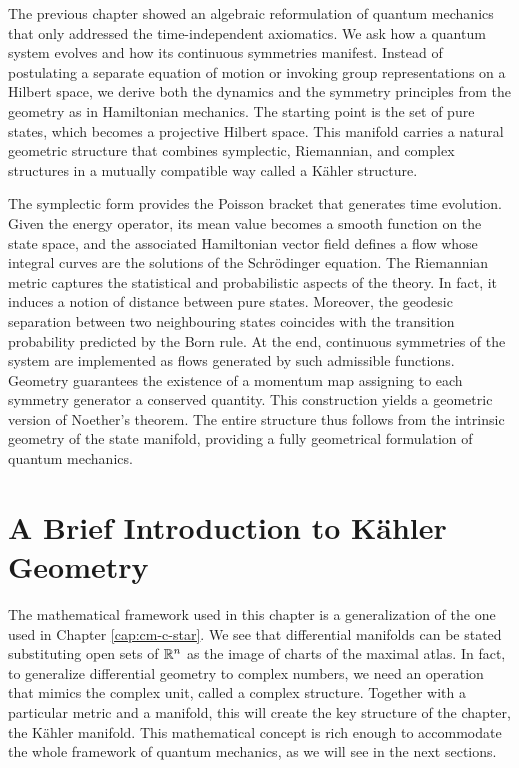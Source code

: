 The previous chapter showed an algebraic reformulation of quantum mechanics that only addressed the time-independent axiomatics. We ask how a quantum system evolves and how its continuous symmetries manifest. Instead of postulating a separate equation of motion or invoking group representations on a Hilbert space, we derive both the dynamics and the symmetry principles from the geometry as in Hamiltonian mechanics. The starting point is the set of pure states, which becomes a projective Hilbert space. This manifold carries a natural geometric structure that combines symplectic, Riemannian, and complex structures in a mutually compatible way called a Kähler structure. 

The symplectic form provides the Poisson bracket that generates time evolution. Given the energy operator, its mean value becomes a smooth function on the state space, and the associated Hamiltonian vector field defines a flow whose integral curves are the solutions of the Schrödinger equation. The Riemannian metric captures the statistical and probabilistic aspects of the theory. In fact, it induces a notion of distance between pure states. Moreover, the geodesic separation between two neighbouring states coincides with the transition probability predicted by the Born rule. At the end, continuous symmetries of the system are implemented as flows generated by such admissible functions. Geometry guarantees the existence of a momentum map assigning to each symmetry generator a conserved quantity. This construction yields a geometric version of Noether’s theorem. The entire structure thus follows from the intrinsic geometry of the state manifold, providing a fully geometrical formulation of quantum mechanics.
	
\section{A Brief Introduction to Kähler Geometry}
\label{sec:almost-kahler-hilbertian}
The mathematical framework used in this chapter is a generalization of the one used in Chapter \ref{cap:cm-c-star}. We see that differential manifolds can be stated substituting open sets of $\mathbb{R}^n$ as the image of charts of the maximal atlas. In fact, to generalize differential geometry to complex numbers, we need an operation that mimics the complex unit, called a complex structure. Together with a particular metric and a manifold, this will create the key structure of the chapter, the Kähler manifold. This mathematical concept is rich enough to accommodate the whole framework of quantum mechanics, as we will see in the next sections.

